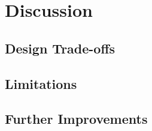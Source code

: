 \chapter{Discussion}
\label{chap:discussion}


\section{Design Trade-offs}
\label{sec:trade-offs}

\section{Limitations}
\label{sec:limitations-discussion}

\section{Further Improvements}
\label{sec:further-improvements}
